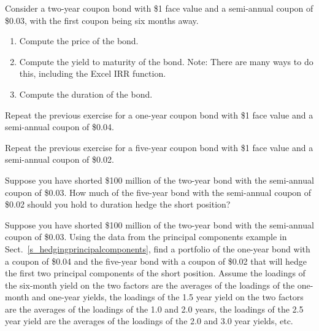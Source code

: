 \begin{prob}
\end{prob}\begin{prob} Consider a two-year coupon bond with \$1 face value and a semi-annual coupon of \$0.03, with the first coupon being six months away.
\begin{enumerate}\renewcommand{\labelenumi}{(\alph{enumi})}
\item Compute the price of the bond.
\item Compute the yield to maturity of the bond.  Note: There are many ways to do this, including the Excel IRR function.
\item Compute the duration of the bond.
\end{enumerate}
\end{prob}\begin{prob} Repeat the previous exercise for a one-year coupon bond with \$1 face value and a semi-annual coupon of \$0.04.
\end{prob}\begin{prob} Repeat the previous exercise for a five-year coupon bond with \$1 face value and a semi-annual coupon of \$0.02.
\end{prob}\begin{prob} Suppose you have shorted \$100 million of the two-year bond with the semi-annual coupon of \$0.03.  How much of the five-year bond with the semi-annual coupon of \$0.02 should you hold to duration hedge the short position?
\end{prob}\begin{prob} Suppose you have shorted \$100 million of the two-year bond with the semi-annual coupon of \$0.03.  Using the data from the principal components example in Sect.~\ref{s_hedgingprincipalcomponents}, find a portfolio of the one-year bond with a coupon of \$0.04 and the five-year bond with a coupon of \$0.02 that will hedge the first two principal components of the short position.  Assume the loadings of the six-month yield on the two factors are the averages of the loadings of the one-month and one-year yields, the loadings of the 1.5 year yield on the two factors are the averages of the loadings of the 1.0 and 2.0 years, the loadings of the 2.5 year yield are the averages of the loadings of the 2.0 and 3.0 year yields, etc.
\end{prob}

